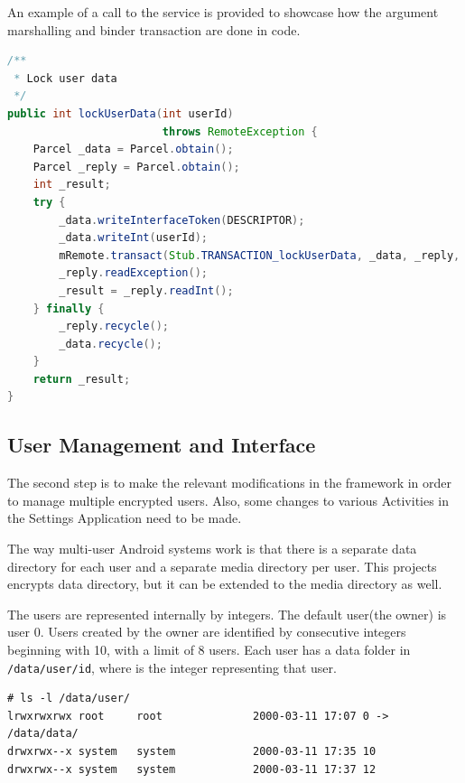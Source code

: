 An example of a call to the service is provided to showcase how the argument marshalling and binder transaction are done in code.

\begin{minipage}{\linewidth}
\begin{lstlisting}[language=Java, caption=lockUserData service method, label=lst:lock-user-data-multi-user]
/**
 * Lock user data
 */
public int lockUserData(int userId)
                        throws RemoteException {
	Parcel _data = Parcel.obtain();
	Parcel _reply = Parcel.obtain();
	int _result;
	try {
		_data.writeInterfaceToken(DESCRIPTOR);
		_data.writeInt(userId);
		mRemote.transact(Stub.TRANSACTION_lockUserData, _data, _reply, 0);
		_reply.readException();
		_result = _reply.readInt();
	} finally {
		_reply.recycle();
		_data.recycle();
	}
	return _result;
}
\end{lstlisting}
\end{minipage}

\subsection{User Management and Interface}
\label{sub-sec:user-mngmt-inter-multi-user}

The second step is to make the relevant modifications in the framework in order to manage multiple encrypted users. Also, some changes to various Activities in the Settings Application need to be made.

The way multi-user Android systems work is that there is a separate data directory for each user and a separate media directory per user. This projects encrypts data directory, but it can be extended to the media directory as well.

The users are represented internally by integers. The default user(the owner) is user 0. Users created by the owner are identified by consecutive integers beginning with 10, with a limit of 8 users. Each user has a data folder in \texttt{/data/user/id}, where  is the integer representing that user.

\begin{minipage}{\linewidth}
\begin{lstlisting}[numbers=none, caption=User Data Directories, label=lst:usr-data-multi-user]
# ls -l /data/user/                                             
lrwxrwxrwx root     root              2000-03-11 17:07 0 -> /data/data/
drwxrwx--x system   system            2000-03-11 17:35 10
drwxrwx--x system   system            2000-03-11 17:37 12
\end{lstlisting}
\end{minipage}

